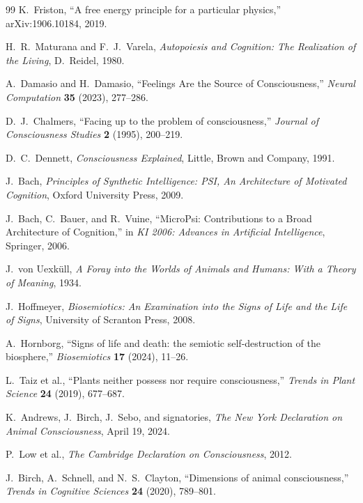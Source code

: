 \documentclass[11pt]{article}
\theoremstyle{remark}
\theoremstyle{plain}
\begin{document}
\begin{thebibliography}{99}
K.\ Friston,
``A free energy principle for a particular physics,''
arXiv:1906.10184, 2019.

H.\ R.\ Maturana and F.\ J.\ Varela,
\emph{Autopoiesis and Cognition: The Realization of the Living},
D.\ Reidel, 1980.

A.\ Damasio and H.\ Damasio,
``Feelings Are the Source of Consciousness,''
\emph{Neural Computation} \textbf{35} (2023), 277--286.

D.\ J.\ Chalmers,
``Facing up to the problem of consciousness,''
\emph{Journal of Consciousness Studies} \textbf{2} (1995), 200--219.

D.\ C.\ Dennett,
\emph{Consciousness Explained},
Little, Brown and Company, 1991.

J.\ Bach,
\emph{Principles of Synthetic Intelligence: PSI, An Architecture of Motivated Cognition},
Oxford University Press, 2009.

J.\ Bach, C.\ Bauer, and R.\ Vuine,
``MicroPsi: Contributions to a Broad Architecture of Cognition,''
in \emph{KI 2006: Advances in Artificial Intelligence},
Springer, 2006.

J.\ von Uexk\"ull,
\emph{A Foray into the Worlds of Animals and Humans: With a Theory of Meaning},
1934.

J.\ Hoffmeyer,
\emph{Biosemiotics: An Examination into the Signs of Life and the Life of Signs},
University of Scranton Press, 2008.

A.\ Hornborg,
``Signs of life and death: the semiotic self-destruction of the biosphere,''
\emph{Biosemiotics} \textbf{17} (2024), 11--26.

L.\ Taiz et al.,
``Plants neither possess nor require consciousness,''
\emph{Trends in Plant Science} \textbf{24} (2019), 677--687.

K.\ Andrews, J.\ Birch, J.\ Sebo, and signatories,
\emph{The New York Declaration on Animal Consciousness},
April 19, 2024.

P.\ Low et al.,
\emph{The Cambridge Declaration on Consciousness},
2012.

J.\ Birch, A.\ Schnell, and N.\ S.\ Clayton,
``Dimensions of animal consciousness,''
\emph{Trends in Cognitive Sciences} \textbf{24} (2020), 789--801.


\end{thebibliography}
\end{document}
